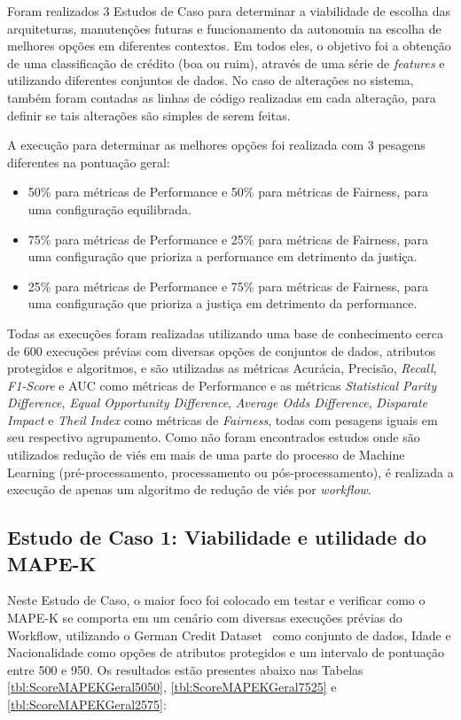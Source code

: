 \documentclass[twocolumn]{article}
\begin{document}
Foram realizados 3 Estudos de Caso para determinar a viabilidade de escolha das arquiteturas, manutenções futuras e funcionamento da autonomia na escolha de melhores opções em diferentes contextos. Em todos eles, o objetivo foi a obtenção de uma classificação de crédito (boa ou ruim), através de uma série de \textit{features} e utilizando diferentes conjuntos de dados. No caso de alterações no sistema, também foram contadas as linhas de código realizadas em cada alteração, para definir se tais alterações são simples de serem feitas.

A execução para determinar as melhores opções foi realizada com 3 pesagens diferentes na pontuação geral:

\begin{itemize}
\item 50\% para métricas de Performance e 50\% para métricas de Fairness, para uma configuração equilibrada.
\item 75\% para métricas de Performance e 25\% para métricas de Fairness, para uma configuração que prioriza a performance em detrimento da justiça.
\item 25\% para métricas de Performance e 75\% para métricas de Fairness, para uma configuração que prioriza a justiça em detrimento da performance.
\end{itemize}

Todas as execuções foram realizadas utilizando uma base de conhecimento cerca de 600 execuções prévias com diversas opções de conjuntos de dados, atributos protegidos e algoritmos, e são utilizadas as métricas Acurácia, Precisão, \textit{Recall}, \textit{F1-Score} e AUC como métricas de Performance e as métricas \textit{Statistical Parity Difference}, \textit{Equal Opportunity Difference}, \textit{Average Odds Difference}, \textit{Disparate Impact} e \textit{Theil Index} como métricas de \textit{Fairness}, todas com pesagens iguais em seu respectivo agrupamento. Como não foram encontrados estudos onde são utilizados redução de viés em mais de uma parte do processo de Machine Learning (pré-processamento, processamento ou pós-processamento), é realizada a execução de apenas um algoritmo de redução de viés por \textit{workflow}.

\subsection{Estudo de Caso 1: Viabilidade e utilidade do MAPE-K}

 Neste Estudo de Caso, o maior foco foi colocado em testar e verificar como o MAPE-K se comporta em um cenário com diversas execuções prévias do Workflow, utilizando o German Credit Dataset~\citep{ucigerman_2021} como conjunto de dados, Idade e Nacionalidade como opções de atributos protegidos e um intervalo de pontuação entre 500 e 950. Os resultados estão presentes abaixo nas Tabelas \ref{tbl:ScoreMAPEKGeral5050}, \ref{tbl:ScoreMAPEKGeral7525} e \ref{tbl:ScoreMAPEKGeral2575}:
\end{document}
